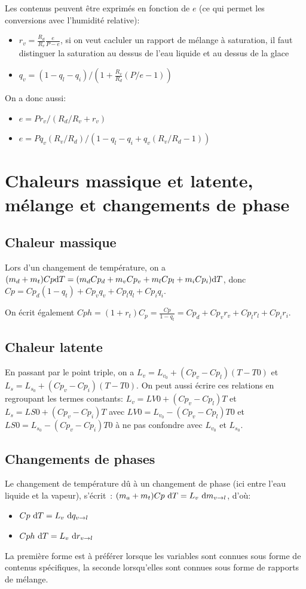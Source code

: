 \documentclass{article}
\begin{document}
Les contenus peuvent être exprimés en fonction de $e$ (ce qui permet les conversions avec l'humidité relative):
\begin{itemize}
 \item $r_v=\frac{R_d}{R_v}\frac{e}{P-e}$, si on veut cacluler un rapport de mélange à saturation, il faut distinguer la saturation au dessus de l'eau liquide et au dessus de la glace
 \item $q_v=(1-q_l-q_i)/(1+\frac{R_v}{R_d}(P/e-1))$
\end{itemize}
On a donc aussi:
\begin{itemize}
 \item $e=P r_v / (R_d/R_v +r_v)$
 \item $e=P q_v (R_v/R_d) / (1-q_l-q_i+q_v(R_v/R_d-1))$
\end{itemize}

\section{Chaleurs massique et latente, mélange et changements de phase}
\label{Cp}
\subsection{Chaleur massique}
Lors d'un changement de température, on a $(m_d+m_t)Cp {\rm d}T=(m_d Cp_d + m_v Cp_v + m_l Cp_l + m_i Cp_i){\rm d}T$, donc {\color{red}$Cp=Cp_d(1-q_t)+Cp_v q_v + Cp_l q_l + Cp_i q_i$}.

On écrit également {\color{red}$Cph=(1+r_t)C_p=\frac{Cp}{1-q_t}=Cp_d+Cp_v r_v + Cp_l r_l + Cp_i r_i$}.

\subsection{Chaleur latente}
En passant par le point triple, on a {\color{red}$L_v=L_{v_0}+(Cp_v-Cp_l)(T-T0)$} et {\color{red}$L_s=L_{s_0}+(Cp_v-Cp_i)(T-T0)$}.
On peut aussi écrire ces relations en regroupant les termes constants: $L_v=LV0+(Cp_v-Cp_l)T$ et $L_s=LS0+(Cp_v-Cp_i)T$ avec $LV0=L_{v_0}-(Cp_v-Cp_l)T0$ et $LS0=L_{s_0}-(Cp_v-Cp_i)T0$ à ne pas confondre avec $L_{v_0}$ et $L_{s_0}$.

\subsection{Changements de phases}
Le changement de température dû à un changement de phase (ici entre l'eau liquide et la vapeur), s'écrit~: $(m_a+m_t)Cp{\ \rm d}T=L_v {\ \rm d}m_{v\rightarrow l}$, d'où:
\begin{itemize}
 \item {\color{red}$Cp{\ \rm d}T=L_v{\ \rm d}q_{v\rightarrow l}$}
 \item {\color{red}$Cph{\ \rm d}T=L_v{\ \rm d}r_{v\rightarrow l}$}
\end{itemize}
La première forme est à préférer lorsque les variables sont connues sous forme de contenus spécifiques, la seconde lorsqu'elles sont connues sous forme de rapports de mélange.
\end{document}
